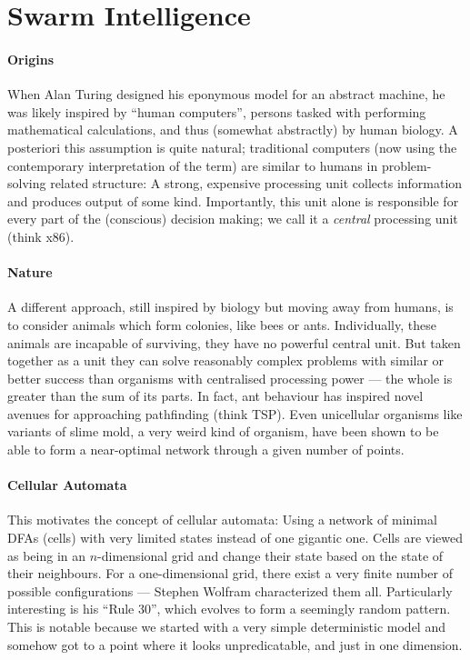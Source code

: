 \documentclass{article}
\begin{document}
\section*{Swarm Intelligence}

\paragraph{Origins} When Alan Turing designed his eponymous model for an abstract machine, he was likely inspired by \enquote{human computers}, persons tasked with performing mathematical calculations, and thus (somewhat abstractly) by human biology. A posteriori this assumption is quite natural; traditional computers (now using the contemporary interpretation of the term) are similar to humans in problem-solving related structure: A strong, expensive processing unit collects information and produces output of some kind. Importantly, this unit alone is responsible for every part of the (conscious) decision making; we call it a \emph{central} processing unit (think x86).

\paragraph{Nature} A different approach, still inspired by biology but moving away from humans, is to consider animals which form colonies, like bees or ants. Individually, these animals are incapable of surviving, they have no powerful central unit. But taken together as a unit they can solve reasonably complex problems with similar or better success than organisms with centralised processing power --- the whole is greater than the sum of its parts. In fact, ant behaviour has inspired novel avenues for approaching pathfinding (think TSP). Even unicellular organisms like variants of slime mold, a very weird kind of organism, have been shown to be able to form a near-optimal network through a given number of points.

\paragraph{Cellular Automata} This motivates the concept of cellular automata: Using a network of minimal DFAs (cells) with very limited states instead of one gigantic one. Cells are viewed as being in an $n$-dimensional grid and change their state based on the state of their neighbours. For a one-dimensional grid, there exist a very finite number of possible configurations --- Stephen Wolfram characterized them all. Particularly interesting is his \enquote{Rule 30}, which evolves to form a seemingly random pattern. This is notable because we started with a very simple deterministic model and somehow got to a point where it looks unpredicatable, and just in one dimension.
\end{document}
